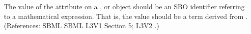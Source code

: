 The value of the attribute  on a \AlgebraicRule, \RateRule
or \AssignmentRule object should be an SBO identifier referring to a
mathematical expression.  That is, the value should be a term derived from
\sbomathformula.  (References: SBML SBML L3V1 Section 5; L3V2 .)
